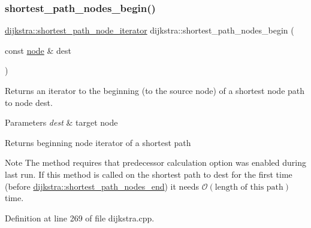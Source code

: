 \subsubsection{\texorpdfstring{shortest\+\_\+path\+\_\+nodes\+\_\+begin()}{shortest\_path\_nodes\_begin()}}
{\footnotesize\ttfamily \mbox{\hyperlink{classdijkstra_a2ba040b6e45343a2c3675788968d9113}{dijkstra\+::shortest\+\_\+path\+\_\+node\+\_\+iterator}} dijkstra\+::shortest\+\_\+path\+\_\+nodes\+\_\+begin (\begin{DoxyParamCaption}\item[{const \mbox{\hyperlink{classnode}{node}} \&}]{dest }\end{DoxyParamCaption})}



Returns an iterator to the beginning (to the source node) of a shortest node path to node {\ttfamily dest}. 


\begin{DoxyParams}{Parameters}
{\em dest} & target node\\
\hline
\end{DoxyParams}
\begin{DoxyReturn}{Returns}
beginning node iterator of a shortest path
\end{DoxyReturn}
\begin{DoxyNote}{Note}
The method requires that predecessor calculation option was enabled during last run. If this method is called on the shortest path to {\ttfamily dest} for the first time (before \mbox{\hyperlink{classdijkstra_ae9846beeabd53a8cf0c0c1af328235b2}{dijkstra\+::shortest\+\_\+path\+\_\+nodes\+\_\+end}}) it needs $\mathcal{O}(\mbox{length of this path})$ time. 
\end{DoxyNote}


Definition at line 269 of file dijkstra.\+cpp.


